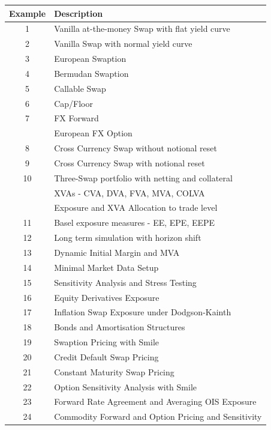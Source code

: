 \documentclass[12pt, a4paper]{article}
\begin{document}
{\begin{table}[hbt]
\scriptsize
\begin{center}
\begin{tabular}{|c|l|}
\hline
Example & Description \\
\hline
\hline
1 & Vanilla at-the-money Swap with flat yield curve \\
\hline
2 & Vanilla Swap with normal yield curve \\
\hline
3 & European Swaption \\
\hline
4 & Bermudan Swaption \\
\hline
5 & Callable Swap \\
\hline
6 & Cap/Floor \\
\hline
7 & FX Forward \\
  & European FX Option \\ 
\hline
8 & Cross Currency Swap without notional reset \\
\hline
9 & Cross Currency Swap with notional reset \\
\hline
10 & Three-Swap portfolio with netting and collateral \\
   & XVAs - CVA, DVA, FVA, MVA, COLVA \\
   & Exposure and XVA Allocation to trade level \\
\hline
11 & Basel exposure measures - EE, EPE, EEPE \\
\hline
12 & Long term simulation with horizon shift \\
\hline
13 & Dynamic Initial Margin and MVA \\
\hline
14 & Minimal Market Data Setup \\
\hline
15 & Sensitivity Analysis and Stress Testing \\
\hline
16 & Equity Derivatives Exposure \\
\hline
17 & Inflation Swap Exposure under Dodgson-Kainth\\
\hline
18 & Bonds and Amortisation Structures\\
\hline
19 & Swaption Pricing with Smile\\
\hline
20 & Credit Default Swap Pricing\\
\hline
21 & Constant Maturity Swap Pricing\\
\hline
22 & Option Sensitivity Analysis with Smile\\
\hline
23 & Forward Rate Agreement and Averaging OIS Exposure\\
\hline
24 & Commodity Forward and Option Pricing and Sensitivity\\

\end{tabular}
\end{center}
\end{table}}
\end{document}
